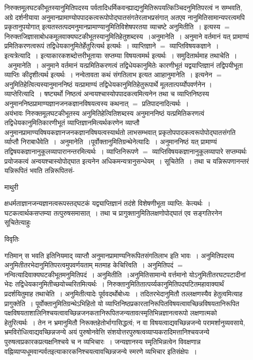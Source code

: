 \documentclass[10pt, openany]{book}
\begin{document}
{निरुक्तमूलघटकीभूतस्यानुमितिपदस्य पर्वतादिधर्मिकवन्ह्याद्यनुमितिरूपयत्किञ्चिदनुमितिपरत्वं न सम्भवति, अग्रे दर्शनीयाया अनुमानप्रामाण्योपपादकत्वरूपोपोद्घातसंगतेरलाभप्रसंगात् अतएव नानुमितिसामान्यपरत्वमपि प्रकृतानुपयोगात् इत्यतस्तत्पदमनुमानप्रामाण्यानुमितिविशेषपरतया व्याचष्टे अनुमितीति~। इत्यस्य $=$ निरुक्तजिज्ञासाबोधकमूलवाक्यघटकीभूतस्यानुमितिहेतुशब्दस्य~।{\la अनुमानेति~।} अनुमाने वर्तमानं यत् प्रामाण्यं प्रमितिकरणत्वरूपं
तद्विधेयकानुमितेर्हेतुरित्यर्थ इत्यर्थः~। व्याप्तिज्ञाने $=$ व्याप्तिविषयकज्ञाने~। इत्यत्रेत्यादि~। इत्याकारकशब्दोत्तरीभूतायाः सप्तम्या विषयत्वमर्थ इत्यर्थः~। समुदितार्थमाह तथाचेति~।~{\la अनुमानेति~।} अनुमाने वर्तमानं यत्प्रमितिकरणत्वं तद्विधेयकानुमितेः कारणीभूतं यद्वयाप्तिज्ञानं तद्विपयीभूता व्याप्तिः कीदृशीत्यर्थ इत्यर्थः~। नन्वेतावता कथं संगतिलाभ इत्यत आाहानुमानेति~। इत्यनेन $=$ अनुमितिहेत्वित्यस्यानुमाननिष्ठं यत्प्रामाण्यं तद्विधेयकानुमितिहेतुरूपार्थे मूलतात्पर्य्योपवर्णनेन । {\la व्याप्तेरित्यादि~।} षष्ट्यर्थो निष्ठत्वं अन्वयश्चास्योपपादकत्वमित्यनेन तथा च व्याप्तिनिष्ठस्य अनुमाननिष्ठप्रामाण्यज्ञानजनकज्ञानविषयत्वस्य कथनात् $=$ प्रतिपादनादित्यर्थः~।\\
अयंभावः निरुक्तमूलघटकीभूतस्य अनुमितिहेत्वितिशब्दस्य अनुमाननिष्ठं यत्प्रमितिकरणत्वं तद्विधेयकानुमितिकारणीभूतं व्याप्तिज्ञानमित्यर्थकरणेन व्याप्तौ
अनुमानप्रामाण्यविषयकज्ञानजनकज्ञानविषयत्वस्यार्थतो लाभसम्भवात् प्रकृतोपपादकत्वरूपोपोद्घातसंगति र्व्याप्तौ निराबाधैवेति~।~{\la अनुमानेति~।}पूर्वोक्तानुमितिग्रन्थेनेत्यादिः~। अनुमाननिष्ठं यत् प्रामाण्यं तद्विषयकज्ञानानुकूलव्यापारानन्तरमित्यर्थः~। व्याप्तिनिरूपणे $=$ व्याप्तिविषयकज्ञानानुकूलव्यापारे सप्तम्यर्थः
प्रयोजकत्वं अन्वयश्चास्योपोद्घात इत्यनेन अधिकमन्यत्रानुसन्धेयम्~। सूचितेति~। तथा च यन्निरूपणानन्तरं यन्निरूपितं भवति तन्निरूपितसं-
\newpage
\begin{center}  माथुरी  \end{center}
\noindent
{\la क्षधर्मताज्ञानजन्यज्ञानत्वरूपस्तद्घटकं यद्व्याप्तिज्ञानं तदंशे विशेषणीभूता व्याप्ति: केत्यर्थः~। घटकत्वार्थकसप्तम्या तत्पुरुषसमासात्~। तथा च प्रागुक्तानुमितिलक्षणोपोद्घातं एव सङ्गतिरनेन सूचितेत्याहुः}
\begin{center}     विवृतिः \end{center}
गतिमान् स भवति इतिनियमाद् व्याप्तौ अनुमानप्रामाण्यनिरूपितसंगतिलाभ इति भावः~। अनुमितिपदस्य अनुमितीतरभेदानुमितिपरत्वमुपवर्णयताम् मतमाह केचित्त्विति~। अनुमितिपदं $=$ नन्वित्यादिवाक्यघटकीभूतमनुमितिपदं~। अनुमितीति~।अनुमितिसामान्ये वर्त्तमानो योऽनुमितीतरघटपटादीनां भेदः तद्विधेयकानुमितीच्छयोच्चरितमित्यर्थः~।
निरुक्तानुमितितात्पर्य्यकानुमितिपदघटितमहावाक्यार्थं प्रदर्शयितुमाह तथाचेति~। अनुमितीत्यादेः पूर्ववदर्थोबोध्यः~। तदितरभेदानुमितौ तल्लक्षणस्यैव हेतुत्वमित्याह {\la प्रागुक्तेति~।} पूर्वोक्तानुमितिग्रन्थेऽभिहितो यो व्याप्तिनिष्ठप्रकारतानिरूपितविषयत्वावच्छिन्नविषयतानिरूपित पक्षविषयताशालिनिश्चयत्वावच्छिन्नजनकतानिरूपितजन्यतावत्स्मृतिभिन्नज्ञानत्वरूपो लक्षणात्मको हेतुरित्यर्थः~। तेन न भ्रमानुमितौ निरूक्तहेतोर्भागासिद्धत्वं; न वा विषयत्वाद्यवच्छिन्नजन्ये परामर्शानुव्यवसाये, भ्रमविरोधित्वाद्यवच्छिन्नजन्ये अयं पुरुषोनवेत्ति संशयोत्तरपुरुषत्वव्याप्यकरादिमत्तानिश्चयजन्ये पुरुषत्वप्रकारकप्रत्यक्षनिश्चये च न व्यभिचारः~। जन्यज्ञानस्य स्मृतिभिन्नत्वेन विवक्षणान्न वह्निव्याप्यधूमवान्पर्वतइत्याकारकनिश्चयत्वावच्छिन्नजन्ये स्मरणे व्यभिचार इतिसंक्षेपः~।\\

}
\end{document}
